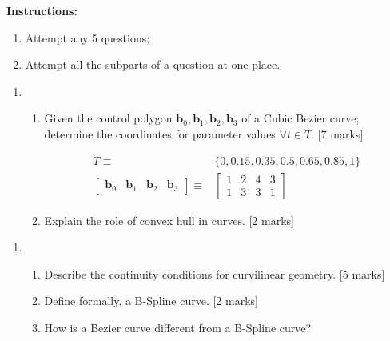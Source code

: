 \documentclass[11pt,a4paper,onecolumn]{tiet-question-paper}
\date{28 May 2024}
\institute{Alpha}
\begin{document}
\maketitle
\textbf{Instructions:}
\begin{enumerate}
\item Attempt any 5 questions;
\item Attempt all the subparts of a question at one
  place.
\end{enumerate}
\bvrhrule[0.4pt]
\begin{enumerate}
\item
  \begin{enumerate}
  \item Given the control polygon
    $\textbf{b}_0, \textbf{b}_1, \textbf{b}_2,
    \textbf{b}_3$ of a Cubic Bezier curve; determine
    the coordinates for parameter values
    $\forall t\in T$. \hfill [7 marks]

    \begin{align*}
      T \equiv
      & \{0, 0.15, 0.35, 0.5, 0.65, 0.85, 1\} \\
      \begin{bmatrix}
        \textbf{b}_0 &\textbf{b}_1& \textbf{b}_2& \textbf{b}_3
      \end{bmatrix} \equiv
      & \begin{bmatrix}
        1&2&4&3\\ 1&3&3&1
      \end{bmatrix}
    \end{align*}
  \item Explain the role of convex hull in curves.
    \hfill[2 marks]
  \end{enumerate}
\end{enumerate}
\bvrhrule[0.4pt]
\begin{enumerate}[resume]
\item
  \begin{enumerate}
  \item Describe the continuity conditions for
    curvilinear geometry.
    \hfill[5 marks]
  \item Define formally, a B-Spline curve. \hfill [2
    marks]
  \item How is a Bezier curve different from a B-Spline
    curve?
  \end{enumerate}
\end{enumerate}
\bvrhrule[0.4pt]
\end{document}
